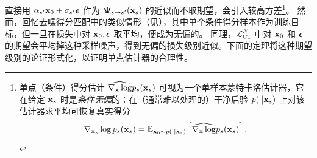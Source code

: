 直接用 $\alpha_{s'}{\mathbf{x}}_0+\sigma_{s'}{\bm{\epsilon}}$ 作为 ${\bm{\Psi}}_{s\to s'}({\mathbf{x}}_s)$ 的近似而不取期望，会引入较高方差\footnote{单点（条件）得分估计 $\widehat{\nabla_{{\mathbf{x}}}\log}p_s({\mathbf{x}}_s)$ 可视为一个单样本蒙特卡洛估计器，它在给定 ${\mathbf{x}}_s$ 时是\emph{条件无偏}的：在（通常难以处理的）干净后验 $p(\cdot|{\mathbf{x}}_s)$ 上对该估计器求平均可恢复真实得分
\[
\nabla_{{\mathbf{x}}_s}\log p_s({\mathbf{x}}_s)
= \mathbb{E}_{{\mathbf{x}}_0\sim p(\cdot|{\mathbf{x}}_s)}
 \left[\widehat{\nabla_{{\mathbf{x}}}\log}p_s({\mathbf{x}}_s)\right].
\]}。
然而，回忆去噪得分匹配中的类似情形（见），其中单个条件得分样本作为训练目标，但一旦在损失中对 ${\mathbf{x}}_0,{\bm{\epsilon}}$ 取平均，便成为无偏的。
同理，$\mathcal{L}_{\mathrm{CT}}^N$ 中对 ${\mathbf{x}}_0$ 和 ${\bm{\epsilon}}$ 的期望会平均掉这种采样噪声，得到无偏的损失级别近似。下面的定理将这种期望级别的论证形式化，以证明单点估计器的合理性。






